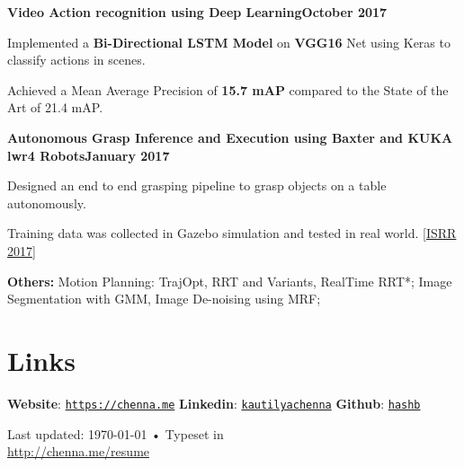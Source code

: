 \documentclass[letterpaper, margin, line, 10.5pt]{resume}
\begin{document}
\begin{resume}
	\textbf{Video Action recognition using Deep Learning}\hfill \textbf{October 2017}
	\begin{list2}
	\item Implemented a \textbf{Bi-Directional LSTM Model} on \textbf{VGG16} Net using Keras to classify actions in scenes.
	\item Achieved a Mean Average Precision of \textbf{15.7 mAP} compared to the State of the Art of 21.4 mAP.
	\end{list2}\vspace{-3.2mm}

	\textbf{Autonomous Grasp Inference and Execution using Baxter and KUKA lwr4 Robots}\hfill \textbf{January 2017}
	\begin{list2}
		\item Designed an end to end grasping pipeline to grasp objects on a table autonomously.
		\item Training data was collected in Gazebo simulation and tested in real world. [\href{https://robot-learning.cs.utah.edu/project/grasp\_inference}{ISRR 2017}]
	\end{list2}\vspace{-3.2mm}

	\textbf{Others:} Motion Planning: TrajOpt, RRT and Variants, RealTime RRT*; Image Segmentation with GMM, Image De-noising using MRF; 
	

	
	\sectionseperator
    \section{\myheadingstyle Links}
	\textbf{Website}: \texttt{\href{https://chenna.me}{https://chenna.me}} \hspace{2mm}%
    \textbf{Linkedin}: \texttt{\href{https://www.linkedin.com/in/kautilyachenna/}{kautilyachenna}} \hspace{2mm}%
    \textbf{Github}: \texttt{\href{https://github.com/hashb}{hashb}}
    \vspace{-3.2mm}

\begin{center}
	{\scriptsize  Last updated: \today\- •\- Typeset in \href{}{
			\XeTeX }\\
		\href{http://chenna.me/resume}{http://chenna.me/resume}}
\end{center}

\end{resume}
\end{document}
